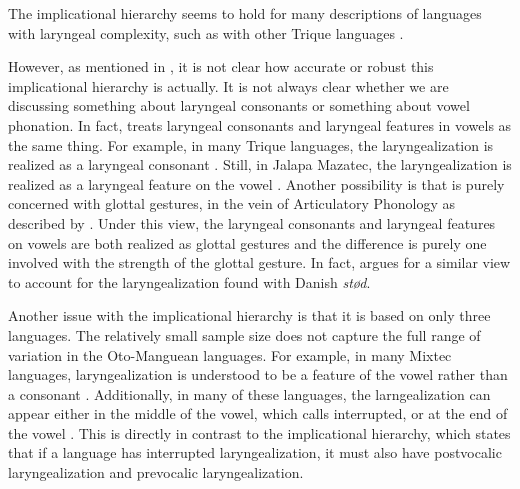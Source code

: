 The implicational hierarchy seems to hold for many descriptions of languages with laryngeal complexity, such as with other Trique languages \citep{dicanioPhoneticsPhonologySan2008,dicanioItunyosoTrique2010,dicanioCoarticulationToneGlottal2012,dicanioPhoneticsFortisLenis2012,dicanioCueWeightPerception2014,dicanioGlottalTogglingItunyoso2020,elliottChicahuaxtlaTriqui2016,hollenbachPhonologyMorphologyTone1984}. 

However, as mentioned in \citet{frazierPhoneticsYucatecMaya2013}, it is not clear how accurate or robust this implicational hierarchy is actually. It is not always clear whether we are discussing something about laryngeal consonants or something about vowel phonation. In fact, \citet{silvermanLaryngealComplexityOtomanguean1997,silvermanPhasingRecoverability1997} treats laryngeal consonants and laryngeal features in vowels as the same thing. For example, in many Trique languages, the laryngealization is realized as a laryngeal consonant \citep{dicanioPhoneticsPhonologySan2008,dicanioItunyosoTrique2010,dicanioCoarticulationToneGlottal2012,dicanioPhoneticsFortisLenis2012,dicanioCueWeightPerception2014,dicanioGlottalTogglingItunyoso2020,elliottChicahuaxtlaTriqui2016,hollenbachPhonologyMorphologyTone1984}. Still, in Jalapa Mazatec, the laryngealization is realized as a laryngeal feature on the vowel \citep{kirkQuantifyingAcousticProperties1993,garellekAcousticConsequencesPhonation2011}. Another possibility is that \citeauthor{silvermanLaryngealComplexityOtomanguean1997} is purely concerned with glottal gestures, in the vein of Articulatory Phonology as described by \citet{browmanNotesSyllableStructure1988,browmanArticulatoryGesturesPhonological1989,browmanArticulatoryPhonologyOverview1992}. Under this view, the laryngeal consonants and laryngeal features on vowels are both realized as glottal gestures and the difference is purely one involved with the strength of the glottal gesture. In fact, \citet{penaStodTimingDomain2022,penaProductionPerceptionStod2024} argues for a similar view to account for the laryngealization found with Danish \textit{stød}. 

Another issue with the implicational hierarchy is that it is based on only three languages. The relatively small sample size does not capture the full range of variation in the Oto-Manguean languages. For example, in many Mixtec languages, laryngealization is understood to be a feature of the vowel rather than a consonant \citep[e.g.,][]{cortesSanSebastianMonte2023,eischensTonePhonationPhonologyPhonetics2022,gerfenPhonologyPhoneticsCoatzospan1999,gerfenProductionPerceptionLaryngealized2005}. Additionally, in many of these languages, the larngealization can appear either in the middle of the vowel, which \citet{silvermanLaryngealComplexityOtomanguean1997} calls interrupted, or at the end of the vowel \citep[e.g.,][]{cortesSanSebastianMonte2023,eischensTonePhonationPhonologyPhonetics2022}. This is directly in contrast to the implicational hierarchy, which states that if a language has interrupted laryngealization, it must also have postvocalic laryngealization and prevocalic laryngealization.

